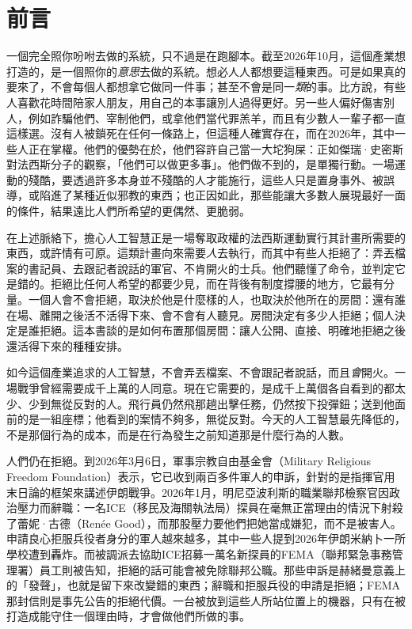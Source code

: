 \chapter*{前言}
一個完全照你吩咐去做的系統，只不過是在跑腳本。截至2026年10月，這個產業想打造的，是一個照你的\emph{意思}去做的系統。想必人人都想要這種東西。可是如果真的要來了，不會每個人都想拿它做同一件事；甚至不會是同一\emph{類}的事。比方說，有些人喜歡花時間陪家人朋友，用自己的本事讓別人過得更好。另一些人偏好傷害別人，例如詐騙他們、宰制他們，或拿他們當代罪羔羊，而且有少數人一輩子都一直這樣選。沒有人被鎖死在任何一條路上，但這種人確實存在，而在2026年，其中一些人正在掌權。他們的優勢在於，他們容許自己當一大坨狗屎：正如傑瑞·史密斯對法西斯分子的觀察，「他們可以做更多事」\autocite{rickandmorty2023}。他們做不到的，是單獨行動。一場運動的殘酷，要透過許多本身並不殘酷的人才能施行，這些人只是置身事外、被誤導，或陷進了某種近似邪教的東西；也正因如此，那些能讓大多數人展現最好一面的條件，結果遠比人們所希望的更偶然、更脆弱。

在上述脈絡下，擔心人工智慧正是一場奪取政權的法西斯運動實行其計畫所需要的東西，或許情有可原。這類計畫向來需要\emph{人}去執行，而其中有些人拒絕了：弄丟檔案的書記員、去跟記者說話的軍官、不肯開火的士兵。他們聽懂了命令，並判定它是錯的。拒絕比任何人希望的都要少見，而在背後有制度撐腰的地方，它最有分量。一個人會不會拒絕，取決於他是什麼樣的人，也取決於他所在的房間：還有誰在場、離開之後活不活得下來、會不會有人聽見。房間決定有多少人拒絕；個人決定是誰拒絕。這本書談的是如何布置那個房間：讓人公開、直接、明確地拒絕之後還活得下來的種種安排。

如今這個產業追求的人工智慧，不會弄丟檔案、不會跟記者說話，而且\emph{會}開火。一場戰爭曾經需要成千上萬的人同意。現在它需要的，是成千上萬個各自看到的都太少、少到無從反對的人。飛行員仍然飛那趟出擊任務，仍然按下投彈鈕；送到他面前的是一組座標；他看到的案情不夠多，無從反對。今天的人工智慧最先降低的，不是那個行為的成本，而是在行為發生之前知道那是什麼行為的人數。

人們仍在拒絕。到2026年3月6日，軍事宗教自由基金會（Military Religious Freedom Foundation）表示，它已收到兩百多件軍人的申訴，針對的是指揮官用末日論的框架來講述伊朗戰爭\autocite{Snopes2026MRFF}。2026年1月，明尼亞波利斯的職業聯邦檢察官因政治壓力而辭職：一名ICE（移民及海關執法局）探員在毫無正當理由的情況下射殺了蕾妮·古德（Renée Good），而那股壓力要他們把她當成嫌犯，而不是被害人\autocite{Kaplan2026MinnProsecutors,CBS2026MinnFraudProsecutors,Wikipedia2026ReneeGood}。申請良心拒服兵役者身分的軍人越來越多，其中一些人提到2026年伊朗米納卜一所學校遭到轟炸\autocite{Sridhar2026CO}。而被調派去協助ICE招募一萬名新探員的FEMA（聯邦緊急事務管理署）員工則被告知，拒絕的話可能會被免除聯邦公職\autocite{Dayen2025FEMAICE,Stanton2026FEMALetter}。那些申訴是赫緒曼意義上的「發聲」，也就是留下來改變錯的東西\autocite{hirschman1970exit}；辭職和拒服兵役的申請是拒絕；FEMA那封信則是事先公告的拒絕代價。一台被放到這些人所站位置上的機器，只有在被打造成能守住一個理由時，才會做他們所做的事。

